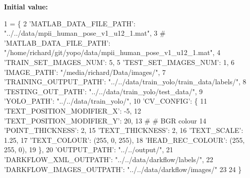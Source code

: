 {\bfseries Initial value\+:}
\begin{DoxyCode}
1 =  \{
2     \textcolor{stringliteral}{'MATLAB\_DATA\_FILE\_PATH'}: \textcolor{stringliteral}{"../../data/mpii\_human\_pose\_v1\_u12\_1.mat"},
3     \textcolor{comment}{# 'MATLAB\_DATA\_FILE\_PATH': "/home/richard/git/yopo/data/mpii\_human\_pose\_v1\_u12\_1.mat",}
4     \textcolor{stringliteral}{'TRAIN\_SET\_IMAGES\_NUM'}: 5,
5     \textcolor{stringliteral}{'TEST\_SET\_IMAGES\_NUM'}: 1,
6     \textcolor{stringliteral}{'IMAGE\_PATH'}: \textcolor{stringliteral}{"/media/richard/Data/images/"},
7     \textcolor{stringliteral}{'TRAINING\_OUTPUT\_PATH'}: \textcolor{stringliteral}{"../../data/train\_yolo/train\_data/labels/"},
8     \textcolor{stringliteral}{'TESTING\_OUT\_PATH'}: \textcolor{stringliteral}{"../../data/train\_yolo/test\_data/"},
9     \textcolor{stringliteral}{'YOLO\_PATH'}: \textcolor{stringliteral}{"../../data/train\_yolo/"},
10     \textcolor{stringliteral}{'CV\_CONFIG'}: \{
11         \textcolor{stringliteral}{'TEXT\_POSITION\_MODIFIER\_X'}: -5,
12         \textcolor{stringliteral}{'TEXT\_POSITION\_MODIFIER\_Y'}: 20,
13         \textcolor{comment}{# # BGR colour}
14         \textcolor{stringliteral}{'POINT\_THICKNESS'}: 2,
15         \textcolor{stringliteral}{'TEXT\_THICKNESS'}: 2,
16         \textcolor{stringliteral}{'TEXT\_SCALE'}: 1.25,
17         \textcolor{stringliteral}{'TEXT\_COLOUR'}: (255, 0, 255),
18         \textcolor{stringliteral}{'HEAD\_REC\_COLOUR'}: (255, 255, 0),
19     \},
20     \textcolor{stringliteral}{'OUTPUT\_PATH'}: \textcolor{stringliteral}{"../../output/"},
21     \textcolor{stringliteral}{'DARKFLOW\_XML\_OUTPATH'}: \textcolor{stringliteral}{"../../data/darkflow/labels/"},
22     \textcolor{stringliteral}{'DARKFLOW\_IMAGES\_OUTPATH'}: \textcolor{stringliteral}{"../../data/darkflow/images/"}
23 
24 \}
\end{DoxyCode}
